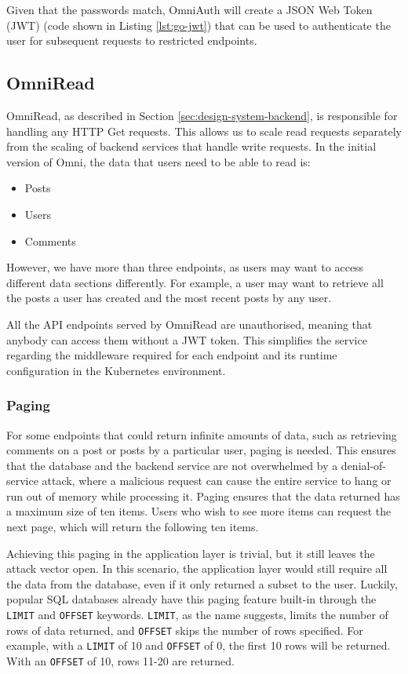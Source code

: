 Given that the passwords match, OmniAuth will create a JSON Web Token (JWT) (code shown in Listing \ref{lst:go-jwt}) that can be used to authenticate the user for subsequent requests to restricted endpoints.



\subsection{OmniRead}
OmniRead, as described in Section \ref{sec:design-system-backend}, is responsible for handling any HTTP Get requests. This allows us to scale read requests separately from the scaling of backend services that handle write requests.
In the initial version of Omni, the data that users need to be able to read is: 
\begin{itemize}
    \item Posts
    \item Users
    \item Comments
\end{itemize}
However, we have more than three endpoints, as users may want to access different data sections differently. For example, a user may want to retrieve all the posts a user has created and the most recent posts by any user. 

All the API endpoints served by OmniRead are unauthorised, meaning that anybody can access them without a JWT token. This simplifies the service regarding the middleware required for each endpoint and its runtime configuration in the Kubernetes environment. 

\subsubsection{Paging}
For some endpoints that could return infinite amounts of data, such as retrieving comments on a post or posts by a particular user, paging is needed.
This ensures that the database and the backend service are not overwhelmed by a denial-of-service attack, where a malicious request can cause the entire service to hang or run out of memory while processing it. 
Paging ensures that the data returned has a maximum size of ten items. Users who wish to see more items can request the next page, which will return the following ten items.

Achieving this paging in the application layer is trivial, but it still leaves the attack vector open. In this scenario, the application layer would still require all the data from the database, even if it only returned a subset to the user. 
Luckily, popular SQL databases already have this paging feature built-in through the \verb|LIMIT| and \verb|OFFSET| keywords.
\verb|LIMIT|, as the name suggests, limits the number of rows of data returned, and \verb|OFFSET| skips the number of rows specified.
For example, with a \verb|LIMIT| of 10 and \verb|OFFSET| of 0, the first 10 rows will be returned. With an \verb|OFFSET| of 10, rows 11-20 are returned. 

